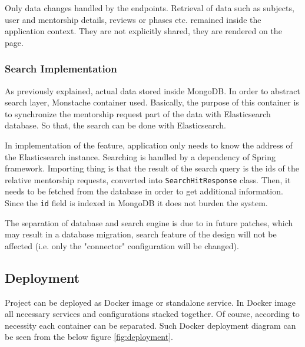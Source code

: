 \documentclass[10pt]{article}
\begin{document}
Only data changes handled by the endpoints. Retrieval of data such as subjects,
user and mentorship details, reviews or phases etc. remained inside the application context.
They are not explicitly shared, they are rendered on the page.


\subsubsection{Search Implementation}
As previously explained, actual data stored inside MongoDB. In order to abstract search layer,
Monstache container used. Basically, the purpose of this container is to synchronize the
mentorship request part of the data with Elasticsearch database. So that, the search can be
done with Elasticsearch.

In implementation of the feature, application only needs to know the address of the Elasticsearch
instance. Searching is handled by a dependency of Spring framework. Importing thing is that the
result of the search query is the ids of the relative mentorship requests, converted into
\texttt{SearchHitResponse} class. Then, it needs to be fetched from the database in order to get
additional information. Since the \texttt{id} field is indexed in MongoDB it does not burden the
system.

The separation of database and search engine is due to in future patches, which may
result in a database migration, search feature of the design will not be affected 
(i.e. only the "connector" configuration will be changed).
\newpage


\subsection{Deployment} \label{deployment}
Project can be deployed as Docker image or standalone service. In Docker image all necessary
services and configurations stacked together. Of course, according to necessity each container
can be separated. Such Docker deployment diagram can be seen from the below figure
\ref{fig:deployment}.
\end{document}
